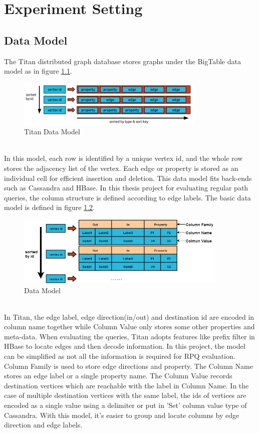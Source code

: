 \chapter{\label{cha:exp-set}Experiment Setting}
\section{Data Model}
The Titan distributed graph database stores graphs under the BigTable data model as in figure \ref{fig:titan-data-model}.\\
\begin{figure}[h!]
  \caption{Titan Data Model\cite{data-model-titan}}
  \label{fig:titan-data-model}
  \centering
    \includegraphics[width=0.8\textwidth]{img/titanstoragelayout}
\end{figure}
\\In this model, each row is identified by a unique vertex id, and the whole row stores the adjacency list of the vertex. Each edge or property is stored as an individual cell for efficient insertion and deletion. This data model fits back-ends such as Cassandra and HBase. In this thesis project for evaluating regular path queries, the column structure is defined according to edge labels. The basic data model is defined in figure \ref{fig:data-model}.\\
\begin{figure}[h!]
  \caption{Data Model}
  \label{fig:data-model}
  \centering
    \includegraphics[width=0.9\textwidth]{img/data-model}
\end{figure}
\\In Titan, the edge label, edge direction(in/out) and destination id are encoded in column name together while Column Value only stores some other properties and meta-data. When evaluating the queries, Titan adopts features like prefix filter in HBase to locate edges and then decode information. In this project, the model can be simplified as not all the information is required for RPQ evaluation. Column Family is used to store edge directions and property. The Column Name stores an edge label or a single property name. The Column Value records destination vertices which are reachable with the label in Column Name. In the case of multiple destination vertices with the same label, the ids of vertices are encoded as a single value using a delimiter or put in 'Set' column value type of Cassandra. With this model, it's easier to group and locate columns by edge direction and edge labels.

